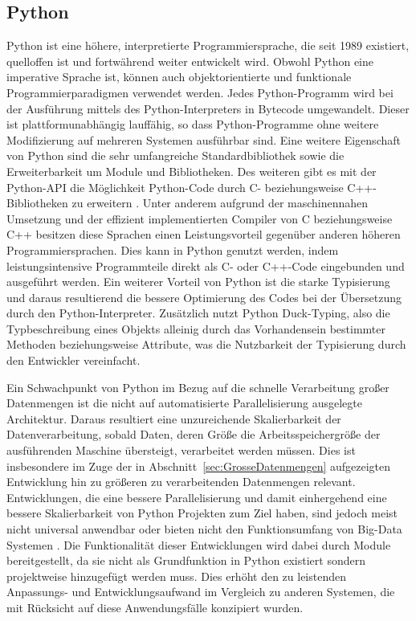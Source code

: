 \subsection{Python}
\label{sec:Python}
Python ist eine höhere, interpretierte Programmiersprache, die seit 1989 existiert, quelloffen ist und fortwährend weiter entwickelt wird. Obwohl Python eine imperative Sprache ist, können auch objektorientierte und funktionale Programmierparadigmen verwendet werden. Jedes Python-Programm wird bei der Ausführung mittels des Python-Interpreters in Bytecode umgewandelt. Dieser ist plattformunabhängig lauffähig, so dass Python-Programme ohne weitere Modifizierung auf mehreren Systemen ausführbar sind. Eine weitere Eigenschaft von Python sind die sehr umfangreiche Standardbibliothek sowie die Erweiterbarkeit um Module und Bibliotheken. Des weiteren gibt es mit der Python-API die Möglichkeit Python-Code durch C- beziehungsweise C++-Bibliotheken zu erweitern \cite{Martelli2006}. Unter anderem aufgrund der maschinennahen Umsetzung und der effizient implementierten Compiler von C beziehungsweise C++ besitzen diese Sprachen einen Leistungsvorteil gegenüber anderen höheren Programmiersprachen. Dies kann in Python genutzt werden, indem leistungsintensive Programmteile direkt als C- oder C++-Code eingebunden und ausgeführt werden. Ein weiterer Vorteil von Python ist die starke Typisierung und daraus resultierend die bessere Optimierung des Codes bei der Übersetzung durch den Python-Interpreter. Zusätzlich nutzt Python Duck-Typing, also die Typbeschreibung eines Objekts alleinig durch das Vorhandensein bestimmter Methoden beziehungsweise Attribute, was die Nutzbarkeit der Typisierung durch den Entwickler vereinfacht.

Ein Schwachpunkt von Python im Bezug auf die schnelle Verarbeitung großer Datenmengen ist die nicht auf automatisierte Parallelisierung ausgelegte Architektur. Daraus resultiert eine unzureichende Skalierbarkeit der Datenverarbeitung, sobald Daten, deren Größe die Arbeitsspeichergröße der ausführenden Maschine übersteigt, verarbeitet werden müssen. Dies ist insbesondere im Zuge der in Abschnitt~\ref{sec:GrosseDatenmengen} aufgezeigten Entwicklung hin zu größeren zu verarbeitenden Datenmengen relevant. Entwicklungen, die eine bessere Parallelisierung und damit einhergehend eine bessere Skalierbarkeit von Python Projekten zum Ziel haben, sind jedoch meist nicht universal anwendbar oder bieten nicht den Funktionsumfang von Big-Data Systemen \cite{ParallelPythonWebsite, DispyWebsite}. Die Funktionalität dieser Entwicklungen wird dabei durch Module bereitgestellt, da sie nicht als Grundfunktion in Python existiert sondern projektweise hinzugefügt werden muss. Dies erhöht den zu leistenden Anpassungs- und Entwicklungsaufwand im Vergleich zu anderen Systemen, die mit Rücksicht auf diese Anwendungsfälle konzipiert wurden.

